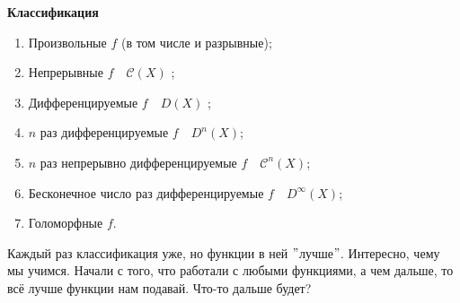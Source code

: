 	\begin{center}
		\textbf{Классификация}
	\end{center}
	\begin{enumerate}
		\item Произвольные $f$ (в том числе и разрывные);
		\item Непрерывные $f \quad \mathcal{C}(X)$ ;
		\item Дифференцируемые $f \quad D(X)$ ;
		\item $n$ раз дифференцируемые $f \quad D^{n}(X)$;
		\item $n$ раз непрерывно дифференцируемые $ f \quad \mathcal{C}^{n}(X)$;
		\item Бесконечное число раз дифференцируемые $f \quad D^{\infty}(X)$;
		\item Голоморфные $f$.
	\end{enumerate}
	Каждый раз классификация уже, но функции в ней $"$лучше$"$. Интересно, чему мы учимся. Начали с того, что работали с любыми функциями, а чем дальше, то всё лучше функции нам подавай. Что-то дальше будет?
